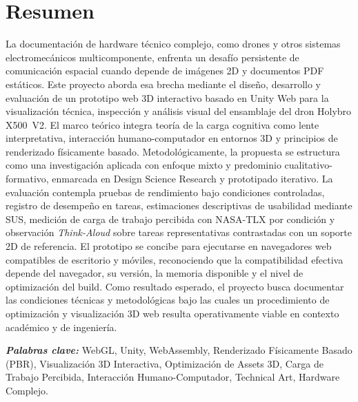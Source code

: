 \documentclass[12pt,letterpaper]{article} %
\begin{document}
\section*{Resumen}
{}
\setlength{\parindent}{0pt} %
La documentaci\'on de hardware t\'ecnico complejo, como drones y otros sistemas electromec\'anicos multicomponente, enfrenta un desaf\'io persistente de comunicaci\'on espacial cuando depende de im\'agenes 2D y documentos PDF est\'aticos. Este proyecto aborda esa brecha mediante el dise\~no, desarrollo y evaluaci\'on de un prototipo web 3D interactivo basado en Unity Web para la visualizaci\'on t\'ecnica, inspecci\'on y an\'alisis visual del ensamblaje del dron Holybro X500~V2. El marco te\'orico integra teor\'ia de la carga cognitiva como lente interpretativa, interacci\'on humano-computador en entornos 3D y principios de renderizado f\'isicamente basado. Metodol\'ogicamente, la propuesta se estructura como una investigaci\'on aplicada con enfoque mixto y predominio cualitativo-formativo, enmarcada en Design Science Research y prototipado iterativo. La evaluaci\'on contempla pruebas de rendimiento bajo condiciones controladas, registro de desempe\~no en tareas, estimaciones descriptivas de usabilidad mediante SUS, medici\'on de carga de trabajo percibida con NASA-TLX por condici\'on y observaci\'on \textit{Think-Aloud} sobre tareas representativas contrastadas con un soporte 2D de referencia. El prototipo se concibe para ejecutarse en navegadores web compatibles de escritorio y m\'oviles, reconociendo que la compatibilidad efectiva depende del navegador, su versi\'on, la memoria disponible y el nivel de optimizaci\'on del build. Como resultado esperado, el proyecto busca documentar las condiciones t\'ecnicas y metodol\'ogicas bajo las cuales un procedimiento de optimizaci\'on y visualizaci\'on 3D web resulta operativamente viable en contexto acad\'emico y de ingenier\'ia.

\hspace{1.27cm}\textit{\textbf{Palabras clave:}} WebGL, Unity, WebAssembly, Renderizado F\'isicamente Basado (PBR), Visualizaci\'on 3D Interactiva, Optimizaci\'on de Assets 3D, Carga de Trabajo Percibida, Interacci\'on Humano-Computador, Technical Art, Hardware Complejo.

\newpage

\end{document}
